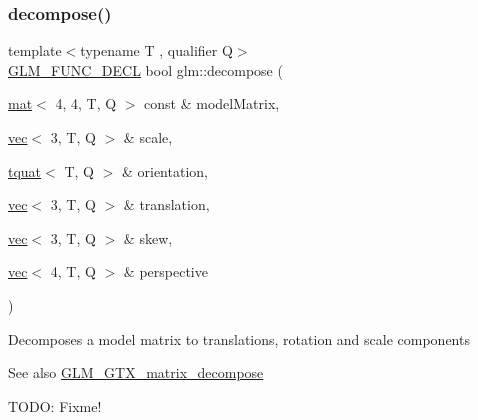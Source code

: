 \subsubsection{\texorpdfstring{decompose()}{decompose()}}
{\footnotesize\ttfamily template$<$typename T , qualifier Q$>$ \\
\mbox{\hyperlink{setup_8hpp_ab2d052de21a70539923e9bcbf6e83a51}{G\+L\+M\+\_\+\+F\+U\+N\+C\+\_\+\+D\+E\+CL}} bool glm\+::decompose (\begin{DoxyParamCaption}\item[{\mbox{\hyperlink{structglm_1_1mat}{mat}}$<$ 4, 4, T, Q $>$ const \&}]{model\+Matrix,  }\item[{\mbox{\hyperlink{structglm_1_1vec}{vec}}$<$ 3, T, Q $>$ \&}]{scale,  }\item[{\mbox{\hyperlink{structglm_1_1tquat}{tquat}}$<$ T, Q $>$ \&}]{orientation,  }\item[{\mbox{\hyperlink{structglm_1_1vec}{vec}}$<$ 3, T, Q $>$ \&}]{translation,  }\item[{\mbox{\hyperlink{structglm_1_1vec}{vec}}$<$ 3, T, Q $>$ \&}]{skew,  }\item[{\mbox{\hyperlink{structglm_1_1vec}{vec}}$<$ 4, T, Q $>$ \&}]{perspective }\end{DoxyParamCaption})}

Decomposes a model matrix to translations, rotation and scale components \begin{DoxySeeAlso}{See also}
\mbox{\hyperlink{group__gtx__matrix__decompose}{G\+L\+M\+\_\+\+G\+T\+X\+\_\+matrix\+\_\+decompose}} 
\end{DoxySeeAlso}
T\+O\+DO\+: Fixme! 